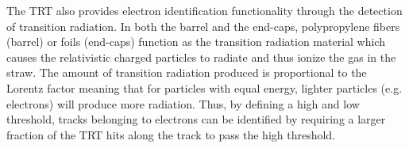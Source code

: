 The TRT also provides electron identification functionality through the
detection of transition radiation.  In both the barrel and the end-caps,
polypropylene fibers (barrel) or foils (end-caps) function as the transition
radiation material which causes the relativistic charged particles to radiate
and thus ionize the gas in the straw.  The amount of transition radiation
produced is proportional to the Lorentz factor meaning that for particles with
equal energy, lighter particles (e.g. electrons) will produce more radiation.
Thus, by defining a high and low threshold, tracks belonging to electrons can
be identified by requiring a larger fraction of the TRT hits along the track to
pass the high threshold.
